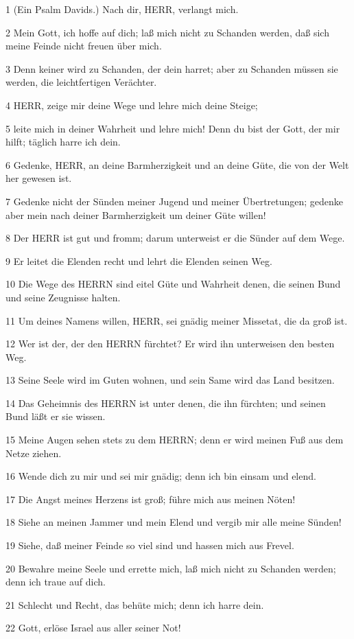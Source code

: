 \par 1 (Ein Psalm Davids.) Nach dir, HERR, verlangt mich.
\par 2 Mein Gott, ich hoffe auf dich; laß mich nicht zu Schanden werden, daß sich meine Feinde nicht freuen über mich.
\par 3 Denn keiner wird zu Schanden, der dein harret; aber zu Schanden müssen sie werden, die leichtfertigen Verächter.
\par 4 HERR, zeige mir deine Wege und lehre mich deine Steige;
\par 5 leite mich in deiner Wahrheit und lehre mich! Denn du bist der Gott, der mir hilft; täglich harre ich dein.
\par 6 Gedenke, HERR, an deine Barmherzigkeit und an deine Güte, die von der Welt her gewesen ist.
\par 7 Gedenke nicht der Sünden meiner Jugend und meiner Übertretungen; gedenke aber mein nach deiner Barmherzigkeit um deiner Güte willen!
\par 8 Der HERR ist gut und fromm; darum unterweist er die Sünder auf dem Wege.
\par 9 Er leitet die Elenden recht und lehrt die Elenden seinen Weg.
\par 10 Die Wege des HERRN sind eitel Güte und Wahrheit denen, die seinen Bund und seine Zeugnisse halten.
\par 11 Um deines Namens willen, HERR, sei gnädig meiner Missetat, die da groß ist.
\par 12 Wer ist der, der den HERRN fürchtet? Er wird ihn unterweisen den besten Weg.
\par 13 Seine Seele wird im Guten wohnen, und sein Same wird das Land besitzen.
\par 14 Das Geheimnis des HERRN ist unter denen, die ihn fürchten; und seinen Bund läßt er sie wissen.
\par 15 Meine Augen sehen stets zu dem HERRN; denn er wird meinen Fuß aus dem Netze ziehen.
\par 16 Wende dich zu mir und sei mir gnädig; denn ich bin einsam und elend.
\par 17 Die Angst meines Herzens ist groß; führe mich aus meinen Nöten!
\par 18 Siehe an meinen Jammer und mein Elend und vergib mir alle meine Sünden!
\par 19 Siehe, daß meiner Feinde so viel sind und hassen mich aus Frevel.
\par 20 Bewahre meine Seele und errette mich, laß mich nicht zu Schanden werden; denn ich traue auf dich.
\par 21 Schlecht und Recht, das behüte mich; denn ich harre dein.
\par 22 Gott, erlöse Israel aus aller seiner Not!

